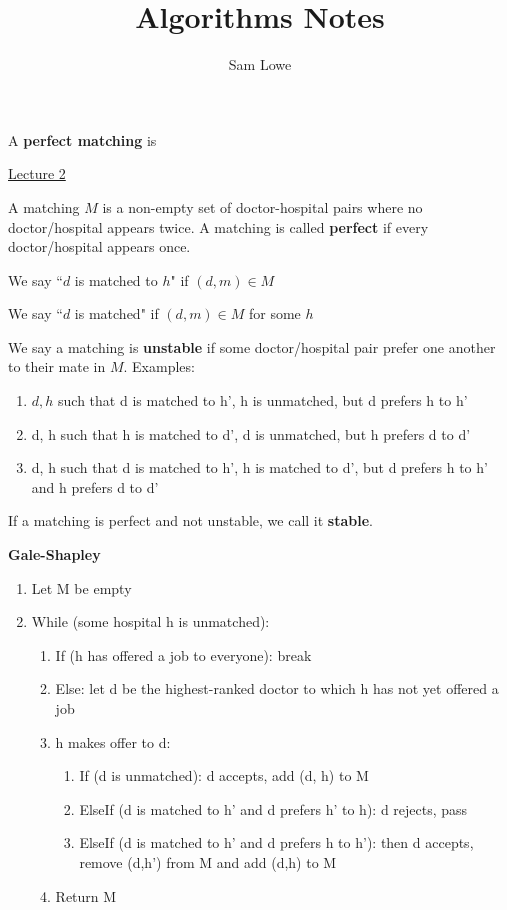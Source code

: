 \documentclass[12pt]{article}
\title{Algorithms Notes}
\author{Sam Lowe}
\begin{document}
\maketitle

\tableofcontents

\pagebreak

A \textbf{perfect matching} is


\underline{Lecture 2}

A matching $M$ is a non-empty set of doctor-hospital pairs where no doctor/hospital appears twice. A matching is called \textbf{perfect} if every doctor/hospital appears once.

We say ``$d$ is matched to $h$" if $(d, m) \in M$

We say ``$d$ is matched" if $(d, m) \in M$ for some $h$

We say a matching is \textbf{unstable} if some doctor/hospital pair prefer one another to their mate in $M$. Examples: \begin{enumerate}
    \item $d, h$ such that d is matched to h', h is unmatched, but d prefers h to h'
    \item d, h such that h is matched to d', d is unmatched, but h prefers d to d'
    \item d, h such that d is matched to h', h is matched to d', but d prefers h to h' and h prefers d to d'
\end{enumerate}

If a matching is perfect and not unstable, we call it \textbf{stable}.

\textbf{Gale-Shapley}

\begin{enumerate}
    \item Let M be empty
    \item While (some hospital h is unmatched): \begin{enumerate}
        \item If (h has offered a job to everyone): break
        \item Else: let d be the highest-ranked doctor to which h has not yet offered a job
        \item h makes offer to d: \begin{enumerate}
            \item If (d is unmatched): d accepts, add (d, h) to M
            \item ElseIf (d is matched to h' and d prefers h' to h): d rejects, pass
            \item ElseIf (d is matched to h' and d prefers h to h'): then d accepts, remove (d,h') from M and add (d,h) to M
        \end{enumerate}
    \item Return M
    \end{enumerate}
\end{enumerate}
\end{document}

